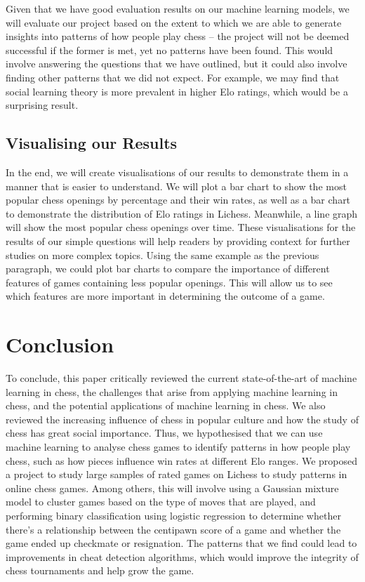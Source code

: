\documentclass[%
 superscriptaddress,
showpacs,preprintnumbers,
 amsmath,
 amssymb,
 aps,
 pra,
showkeys,
onecolumn,
notitlepage,
11pt,
tightenlines      %
]{revtex4-1}
\begin{document}
Given that we have good evaluation results on our machine learning models, we will evaluate our project based on the extent to which we are able to generate insights into patterns of how people play chess -- the project will not be deemed successful if the former is met, yet no patterns have been found. This would involve answering the questions that we have outlined, but it could also involve finding other patterns that we did not expect. For example, we may find that social learning theory is more prevalent in higher Elo ratings, which would be a surprising result. 

\subsection{Visualising our Results}
In the end, we will create visualisations of our results to demonstrate them in a manner that is easier to understand. We will plot a bar chart to show the most popular chess openings by percentage and their win rates, as well as a bar chart to demonstrate the distribution of Elo ratings in Lichess. Meanwhile, a line graph will show the most popular chess openings over time. These visualisations for the results of our simple questions will help readers by providing context for further studies on more complex topics. Using the same example as the previous paragraph, we could plot bar charts to compare the importance of different features of games containing less popular openings. This will allow us to see which features are more important in determining the outcome of a game.

\section{Conclusion}
To conclude, this paper critically reviewed the current state-of-the-art of machine learning in chess, the challenges that arise from applying machine learning in chess, and the potential applications of machine learning in chess. We also reviewed the increasing influence of chess in popular culture and how the study of chess has great social importance. Thus, we hypothesised that we can use machine learning to analyse chess games to identify patterns in how people play chess, such as how pieces influence win rates at different Elo ranges. We proposed a project to study large samples of rated games on Lichess to study patterns in online chess games. Among others, this will involve using a Gaussian mixture model to cluster games based on the type of moves that are played, and performing binary classification using logistic regression to determine whether there's a relationship between the centipawn score of a game and whether the game ended up checkmate or resignation. The patterns that we find could lead to improvements in cheat detection algorithms, which would improve the integrity of chess tournaments and help grow the game.
\end{document}
